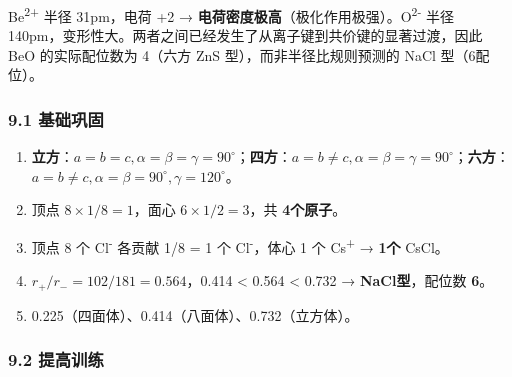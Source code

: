 Be\textsuperscript{2+} 半径 31pm，电荷 +2 → \textbf{电荷密度极高}（极化作用极强）。O\textsuperscript{2-} 半径 140pm，变形性大。两者之间已经发生了从离子键到共价键的显著过渡，因此 BeO 的实际配位数为 4（六方 ZnS 型），而非半径比规则预测的 NaCl 型（6配位）。

\subsubsection{9.1 基础巩固}\label{ux57faux7840ux5de9ux56fa-1}

\begin{enumerate}
\def\labelenumi{\arabic{enumi}.}
\item
  \textbf{立方}：\(a=b=c, \alpha=\beta=\gamma=90^\circ\)；\textbf{四方}：\(a=b\neq c, \alpha=\beta=\gamma=90^\circ\)；\textbf{六方}：\(a=b\neq c, \alpha=\beta=90^\circ, \gamma=120^\circ\)。
\item
  顶点 \(8 \times 1/8 = 1\)，面心 \(6 \times 1/2 = 3\)，共 \textbf{4个原子}。
\item
  顶点 8 个 Cl\textsuperscript{-} 各贡献 1/8 = 1 个 Cl\textsuperscript{-}，体心 1 个 Cs\textsuperscript{+} → \textbf{1个} CsCl。
\item
  \(r_+/r_- = 102/181 = 0.564\)，0.414 \textless{} 0.564 \textless{} 0.732 → \textbf{NaCl型}，配位数 \textbf{6}。
\item
  0.225（四面体）、0.414（八面体）、0.732（立方体）。
\end{enumerate}

\subsubsection{9.2 提高训练}\label{ux63d0ux9ad8ux8badux7ec3-1}

